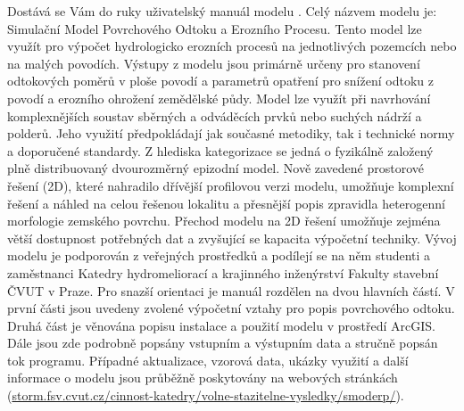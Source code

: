 

Dostává se Vám do ruky uživatelský manuál modelu \smod. Celý názvem modelu je: Simulační Model Povrchového Odtoku a Erozního Procesu. Tento model lze využít pro výpočet hydrologicko erozních procesů na jednotlivých pozemcích nebo na malých povodích. Výstupy z modelu jsou primárně určeny pro stanovení odtokových poměrů v ploše povodí a parametrů opatření pro snížení odtoku z povodí a erozního ohrožení zemědělské půdy. Model lze využít při navrhování komplexnějších soustav sběrných a odváděcích prvků nebo suchých nádrží a polderů. Jeho využití předpokládají jak současné metodiky, tak i technické normy a doporučené standardy.
Z hlediska kategorizace se jedná o fyzikálně založený plně distribuovaný dvourozměrný epizodní model. 
% 
Nově zavedené prostorové řešení (2D), které nahradilo dřívější profilovou verzi modelu, umožňuje komplexní řešení a náhled na celou řešenou lokalitu a přesnější popis zpravidla heterogenní morfologie zemského povrchu. 
% 
Přechod modelu na 2D řešení umožňuje zejména větší dostupnost potřebných dat a zvyšující se kapacita výpočetní techniky. 
% 
% 
% 
Vývoj modelu je podporován z veřejných prostředků a podílejí se na něm studenti a zaměstnanci Katedry hydromeliorací a krajinného inženýrství Fakulty stavební ČVUT v Praze.
Pro snazší orientaci je manuál rozdělen na dvou hlavních částí. 
% 
V první části jsou uvedeny zvolené výpočetní vztahy pro popis povrchového odtoku. 
% 
Druhá část je věnována popisu instalace a použití modelu v prostředí ArcGIS. Dále jsou zde podrobně popsány vstupním a výstupním data a stručně popsán tok programu. 
Případné aktualizace, vzorová data, ukázky využití a další informace o modelu \smod jsou průběžně poskytovány na webových stránkách (\href{http://storm.fsv.cvut.cz/cinnost-katedry/volne-stazitelne-vysledky/smoderp/?lang=cz}{storm.fsv.cvut.cz/cinnost-katedry/volne-stazitelne-vysledky/smoderp/}).